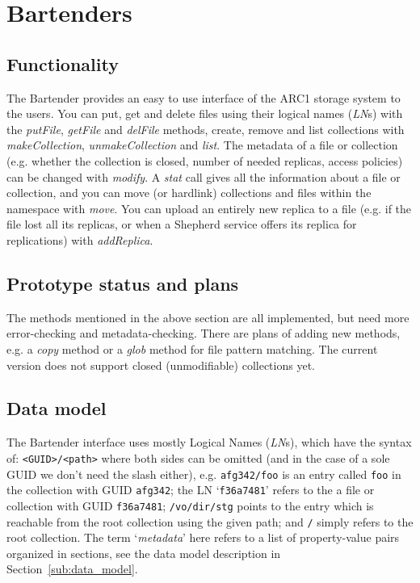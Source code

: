 \documentclass{book}
\begin{document}
\newpage

\section{Bartenders} %
\label{sec:bartenders}

\subsection{Functionality} %

The Bartender provides an easy to use interface of the ARC1 storage system to the users. You can put, get and delete files using their logical names (\emph{LN}s) with the \emph{putFile}, \emph{getFile} and \emph{delFile} methods, create, remove and list collections with \emph{makeCollection}, \emph{unmakeCollection} and \emph{list}. The metadata of a file or collection (e.g. whether the collection is closed, number of needed replicas, access policies) can be changed with \emph{modify}. A \emph{stat} call gives all the information about a file or collection, and you can move (or hardlink) collections and files within the namespace with \emph{move}. You can upload an entirely new replica to a file (e.g. if the file lost all its replicas, or when a Shepherd service offers its replica for replications) with \emph{addReplica}.


\subsection{Prototype status and plans} %

The methods mentioned in the above section are all implemented, but need more error-checking and metadata-checking. There are plans of adding new methods, e.g. a \emph{copy} method or a \emph{glob} method for file pattern matching. The current version does not support closed (unmodifiable) collections yet.


\subsection{Data model} %

The Bartender interface uses mostly Logical Names (\emph{LN}s), which have the syntax of: \verb!<GUID>/<path>! where both sides can be omitted (and in the case of a sole GUID we don't need the slash either), e.g. \verb!afg342/foo! is an entry called \verb!foo! in the collection with GUID \verb!afg342!; the LN `\verb!f36a7481!' refers to the a file or collection with GUID \verb!f36a7481!; \verb!/vo/dir/stg! points to the entry which is reachable from the root collection using the given path; and \verb!/! simply refers to the root collection.
The term `\emph{metadata}' here refers to a list of property-value pairs organized in sections, see the data model description in Section~\ref{sub:data_model}.
\end{document}
